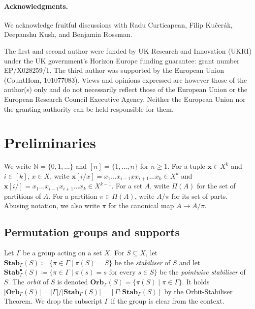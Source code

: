 \documentclass[10pt,a4paper]{article}
\theoremstyle{definition}
\theoremstyle{plain}
\theoremstyle{remark}
\newcommand{\Stab}{\mathbf{Stab}}
\newcommand{\StabP}{\Stab^{\bullet}}
\newcommand{\Orb}{\mathbf{Orb}}
\begin{document}
\paragraph*{Acknowledgments.}We acknowledge fruitful discussions with Radu Curticapean, Filip Kučerák, Deepanshu Kush, and Benjamin Rossman.

The first and second author were funded by UK Research and Innovation (UKRI) under
the UK government’s Horizon Europe funding guarantee: grant number EP/X028259/1.
The third author was supported by the European Union (CountHom, 101077083). Views and opinions expressed are however those of the author(s) only and do not necessarily reflect those of the European Union or the European Research Council Executive Agency. Neither the European Union nor the granting
authority can be held responsible for them.



\section{Preliminaries}
\label{sec:shortPreliminaries}

We write $\mathbb{N} = \{0,1,\dots\}$ and $[n] = \{1, \dots, n\}$ for $n \geq 1$.
For a tuple $\boldsymbol{x} \in X^k$ and $i \in [k]$, $x \in X$, write $\boldsymbol{x}[i/x] = x_1 \dots x_{i-1} x x_{i+1} \dots x_k \in X^k$ and $\boldsymbol{x}[i/] = x_1 \dots x_{i-1} x_{i+1} \dots x_k \in X^{k-1}$.
For a set $A$,
write $\Pi(A)$ for the set of partitions of $A$.
For a partition $\pi \in \Pi(A)$,
write $A/\pi$ for its set of parts.
Abusing notation, we also write $\pi$ for the canonical map $A \to A/\pi$.



\subsection{Permutation groups and supports}
\label{sec:supports}
Let $\Gamma$ be a group acting on a set $X$.  
For $S \subseteq X$, let $\Stab_\Gamma(S) \coloneqq \{ \pi \in \Gamma \mid \pi(S) = S\}$ be the \emph{stabiliser} of $S$ and let $\StabP_\Gamma(S) \coloneqq \{ \pi \in \Gamma \mid \pi(s) = s \text{ for every } s\in S\}$ be the \emph{pointwise stabiliser} of $S$.
The \emph{orbit} of $S$ is denoted $\Orb_{\Gamma}(S) = \{ \pi(S) \mid \pi \in \Gamma  \}$. It holds $|\Orb_\Gamma(S)| = |\Gamma| / |\Stab_\Gamma(S)| = [\Gamma : \Stab_\Gamma(S)]$ by the Orbit-Stabiliser Theorem.
We drop the subscript $\Gamma$ if the group is clear from the context.
\end{document}
